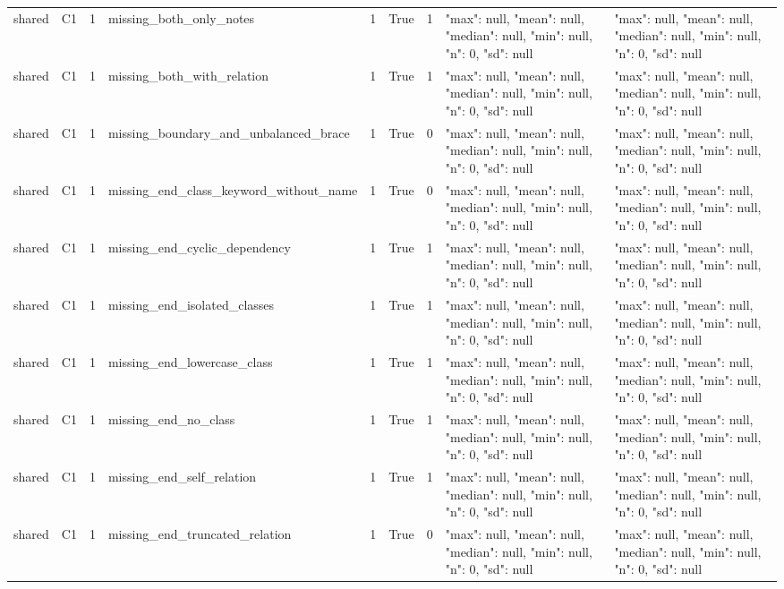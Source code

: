 \begin{tabular}{lllllllll}
shared & C1 & 1 & missing\_both\_only\_notes & 1 & True & 1 & {"max": null, "mean": null, "median": null, "min": null, "n": 0, "sd": null} & {"max": null, "mean": null, "median": null, "min": null, "n": 0, "sd": null} \\
shared & C1 & 1 & missing\_both\_with\_relation & 1 & True & 1 & {"max": null, "mean": null, "median": null, "min": null, "n": 0, "sd": null} & {"max": null, "mean": null, "median": null, "min": null, "n": 0, "sd": null} \\
shared & C1 & 1 & missing\_boundary\_and\_unbalanced\_brace & 1 & True & 0 & {"max": null, "mean": null, "median": null, "min": null, "n": 0, "sd": null} & {"max": null, "mean": null, "median": null, "min": null, "n": 0, "sd": null} \\
shared & C1 & 1 & missing\_end\_class\_keyword\_without\_name & 1 & True & 0 & {"max": null, "mean": null, "median": null, "min": null, "n": 0, "sd": null} & {"max": null, "mean": null, "median": null, "min": null, "n": 0, "sd": null} \\
shared & C1 & 1 & missing\_end\_cyclic\_dependency & 1 & True & 1 & {"max": null, "mean": null, "median": null, "min": null, "n": 0, "sd": null} & {"max": null, "mean": null, "median": null, "min": null, "n": 0, "sd": null} \\
shared & C1 & 1 & missing\_end\_isolated\_classes & 1 & True & 1 & {"max": null, "mean": null, "median": null, "min": null, "n": 0, "sd": null} & {"max": null, "mean": null, "median": null, "min": null, "n": 0, "sd": null} \\
shared & C1 & 1 & missing\_end\_lowercase\_class & 1 & True & 1 & {"max": null, "mean": null, "median": null, "min": null, "n": 0, "sd": null} & {"max": null, "mean": null, "median": null, "min": null, "n": 0, "sd": null} \\
shared & C1 & 1 & missing\_end\_no\_class & 1 & True & 1 & {"max": null, "mean": null, "median": null, "min": null, "n": 0, "sd": null} & {"max": null, "mean": null, "median": null, "min": null, "n": 0, "sd": null} \\
shared & C1 & 1 & missing\_end\_self\_relation & 1 & True & 1 & {"max": null, "mean": null, "median": null, "min": null, "n": 0, "sd": null} & {"max": null, "mean": null, "median": null, "min": null, "n": 0, "sd": null} \\
shared & C1 & 1 & missing\_end\_truncated\_relation & 1 & True & 0 & {"max": null, "mean": null, "median": null, "min": null, "n": 0, "sd": null} & {"max": null, "mean": null, "median": null, "min": null, "n": 0, "sd": null} \\

\end{tabular}
